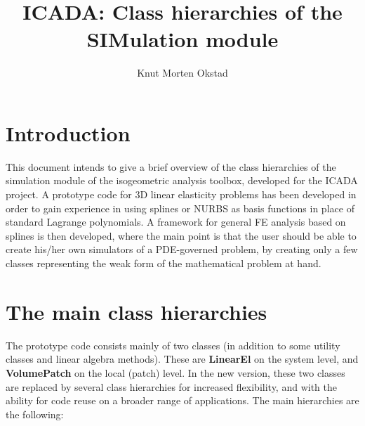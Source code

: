\documentclass{article}
\title{ICADA: Class hierarchies of the {\bf SIM}ulation module}
\author{Knut Morten Okstad}
\begin{document}
\maketitle

\section{Introduction}

This document intends to give a brief overview of the class hierarchies of the
simulation module of the isogeometric analysis toolbox,
developed for the ICADA project.
A prototype code for 3D linear elasticity problems has been developed in order
to gain experience in using splines or NURBS as basis functions in place of
standard Lagrange polynomials.
A framework for general FE analysis based on splines is then developed,
where the main point is that the user should be able to create his/her
own simulators of a PDE-governed problem, by creating only a few classes
representing the weak form of the mathematical problem at hand.

\section{The main class hierarchies}

The prototype code consists mainly of two classes (in addition to some utility
classes and linear algebra methods).
These are {\bf LinearEl} on the system level,
and {\bf VolumePatch} on the local (patch) level.
In the new version, these two classes are replaced by several class hierarchies
for increased flexibility, and with the ability for code reuse on a broader
range of applications.
The main hierarchies are the following:
\end{document}
